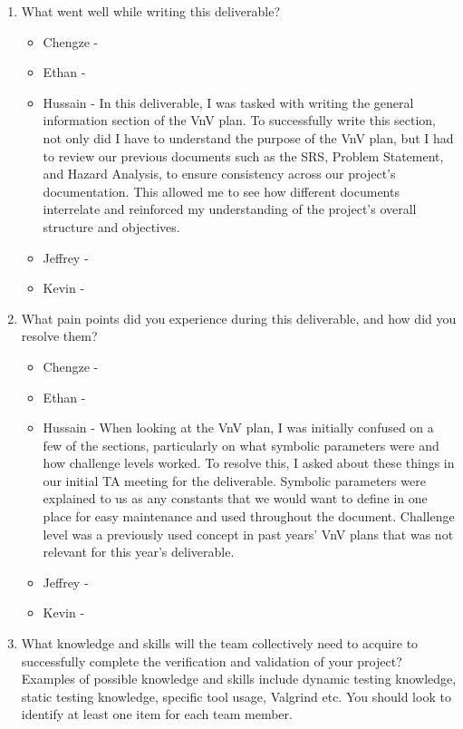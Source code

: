\documentclass[12pt, titlepage]{article}
\begin{document}
\begin{enumerate}
  \item What went well while writing this deliverable?
  \begin{itemize}
    \item Chengze -
    \item Ethan -
    \item Hussain - In this deliverable, I was tasked with writing the
        general information section of the VnV plan. To successfully write
        this section, not only did I have to understand the purpose of the 
        VnV plan, but I had to review our previous documents such as the SRS,
        Problem Statement, and Hazard Analysis, to ensure consistency across 
        our project's documentation. This allowed me to see how different 
        documents interrelate and reinforced my understanding of the 
        project's overall structure and objectives.
    \item Jeffrey -
    \item Kevin -
  \end{itemize}
  \item What pain points did you experience during this deliverable, and how
    did you resolve them?
  \begin{itemize}
    \item Chengze -
    \item Ethan -
    \item Hussain - When looking at the VnV plan, I was initially confused 
    on a few of the sections, particularly on what symbolic parameters were 
    and how challenge levels worked. To resolve this, I asked about these 
    things in our initial TA meeting for the deliverable. Symbolic parameters 
    were explained to us as any constants that we would want to define in one 
    place for easy maintenance and used throughout the document. Challenge 
    level was a previously used concept in past years' VnV plans that was 
    not relevant for this year's deliverable.
    \item Jeffrey -
    \item Kevin -
  \end{itemize}
  \item What knowledge and skills will the team collectively need to acquire to
  successfully complete the verification and validation of your project?
  Examples of possible knowledge and skills include dynamic testing knowledge,
  static testing knowledge, specific tool usage, Valgrind etc.  You should look to
  identify at least one item for each team member.


\end{enumerate}
\end{document}
